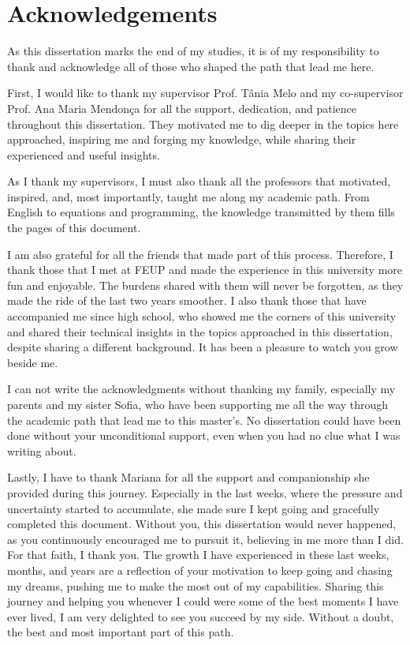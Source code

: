 \chapter*{Acknowledgements}

As this dissertation marks the end of my studies, it is of my responsibility to thank and acknowledge all of those who shaped the path that lead me here.
\par
First, I would like to thank my supervisor Prof. Tânia Melo and my co-supervisor Prof. Ana Maria Mendonça for all the support, dedication, and patience throughout this dissertation. They motivated me to dig deeper in the topics here approached, inspiring me and forging my knowledge, while sharing their experienced and useful insights.
\par
As I thank my supervisors, I must also thank all the professors that motivated, inspired, and, most importantly, taught me along my academic path. From English to equations and programming, the knowledge transmitted by them fills the pages of this document.
\par
I am also grateful for all the friends that made part of this process. Therefore, I thank those that I met at FEUP and made the experience in this university more fun and enjoyable. The burdens shared with them will never be forgotten, as they made the ride of the last two years smoother. I also thank those that have accompanied me since high school, who showed me the corners of this university and shared their technical insights in the topics approached in this dissertation, despite sharing a different background. It has been a pleasure to watch you grow beside me.
\par
I can not write the acknowledgments without thanking my family, especially my parents and my sister Sofia, who have been supporting me all the way through the academic path that lead me to this master's. No dissertation could have been done without your unconditional support, even when you had no clue what I was writing about.
\par
Lastly, I have to thank Mariana for all the support and companionship she provided during this journey. Especially in the last weeks, where the pressure and uncertainty started to accumulate, she made sure I kept going and gracefully completed this document. Without you, this dissertation would never happened, as you continuously encouraged me to pursuit it, believing in me more than I did. For that faith, I thank you. The growth I have experienced in these last weeks, months, and years are a reflection of your motivation to keep going and chasing my dreams, pushing me to make the most out of my capabilities. Sharing this journey and helping you whenever I could were some of the best moments I have ever lived, I am very delighted to see you succeed by my side. Without a doubt, the best and most important part of this path.

\vspace{10mm}
